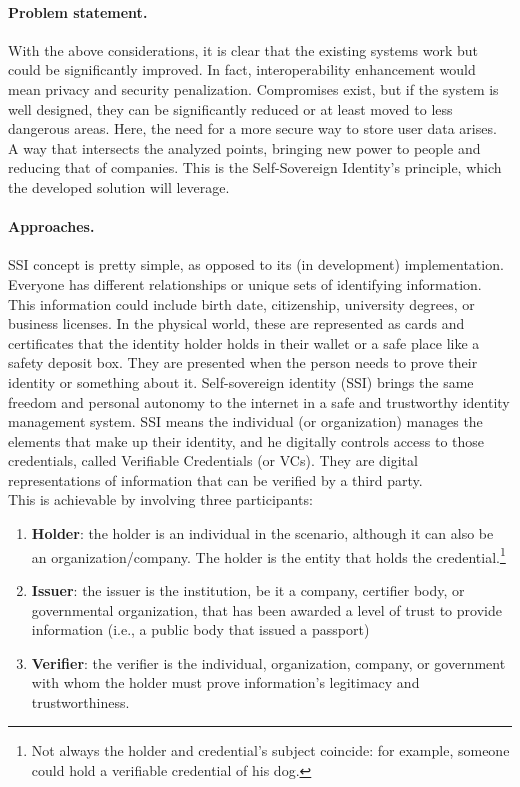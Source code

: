 \paragraph{Problem statement.} With the above considerations, it is clear that 
the existing systems work but could be significantly improved. In fact, 
interoperability enhancement would mean privacy and security penalization. 
Compromises exist, but if the system is well designed, they can be significantly 
reduced or at least moved to less dangerous areas. Here, the need for a more 
secure way to store user data arises. A way that intersects the analyzed points, 
bringing new power to people and reducing that of companies. This is the 
Self-Sovereign Identity's principle, which the developed solution will leverage.

\paragraph{Approaches.} SSI concept is pretty simple, as opposed to its 
(in development) implementation. Everyone has different relationships or 
unique sets of identifying information. This information could include 
birth date, citizenship, university degrees, or business licenses. In the 
physical world, these are represented as cards and certificates that the 
identity holder holds in their wallet or a safe place like a safety deposit 
box. They are presented when the person needs to prove their identity or 
something about it. Self-sovereign identity (SSI) brings the same freedom and 
personal autonomy to the internet in a safe and trustworthy identity management 
system. SSI means the individual (or organization) manages the elements that 
make up their identity, and he digitally controls access to those credentials,
called Verifiable Credentials (or VCs). They are digital representations of
information that can be verified by a third party.
\vspace*{0.3cm}\\
This is achievable by involving three participants:
\begin{enumerate}
    \item \textbf{Holder}: the holder is an individual in the scenario, 
    although it can also be an organization/company. The holder is the 
    entity that holds the credential.\footnote{Not always the holder and 
    credential's subject coincide: for example, someone could hold a verifiable 
    credential of his dog.}
    \item \textbf{Issuer}: the issuer is the institution, be it a company, 
    certifier body, or governmental organization, that has been awarded a 
    level of trust to provide information (i.e., a public body that issued 
    a passport)
    \item \textbf{Verifier}: the verifier is the individual, organization,
    company, or government with whom the holder must prove information's 
    legitimacy and trustworthiness.
\end{enumerate}
